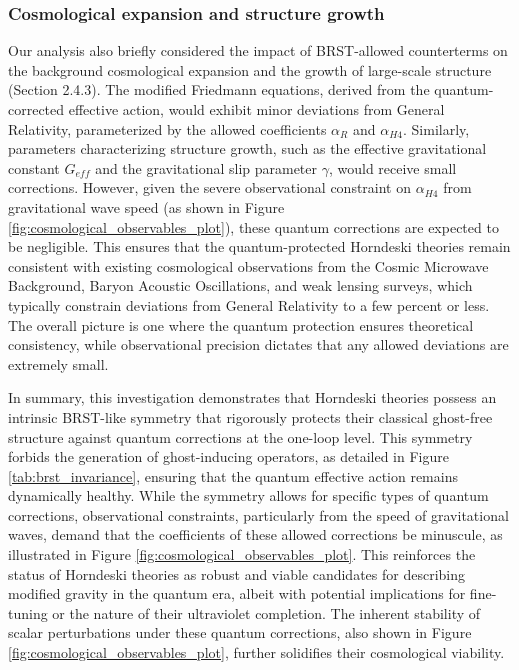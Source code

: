 \documentclass[twocolumn]{aastex631}
\begin{document}
\subsubsection{Cosmological expansion and structure growth}
Our analysis also briefly considered the impact of BRST-allowed counterterms on the background cosmological expansion and the growth of large-scale structure (Section 2.4.3). The modified Friedmann equations, derived from the quantum-corrected effective action, would exhibit minor deviations from General Relativity, parameterized by the allowed coefficients $\alpha_R$ and $\alpha_{H4}$. Similarly, parameters characterizing structure growth, such as the effective gravitational constant $G_{eff}$ and the gravitational slip parameter $\gamma$, would receive small corrections. However, given the severe observational constraint on $\alpha_{H4}$ from gravitational wave speed (as shown in Figure \ref{fig:cosmological_observables_plot}), these quantum corrections are expected to be negligible. This ensures that the quantum-protected Horndeski theories remain consistent with existing cosmological observations from the Cosmic Microwave Background, Baryon Acoustic Oscillations, and weak lensing surveys, which typically constrain deviations from General Relativity to a few percent or less. The overall picture is one where the quantum protection ensures theoretical consistency, while observational precision dictates that any allowed deviations are extremely small.

In summary, this investigation demonstrates that Horndeski theories possess an intrinsic BRST-like symmetry that rigorously protects their classical ghost-free structure against quantum corrections at the one-loop level. This symmetry forbids the generation of ghost-inducing operators, as detailed in Figure \ref{tab:brst_invariance}, ensuring that the quantum effective action remains dynamically healthy. While the symmetry allows for specific types of quantum corrections, observational constraints, particularly from the speed of gravitational waves, demand that the coefficients of these allowed corrections be minuscule, as illustrated in Figure \ref{fig:cosmological_observables_plot}. This reinforces the status of Horndeski theories as robust and viable candidates for describing modified gravity in the quantum era, albeit with potential implications for fine-tuning or the nature of their ultraviolet completion. The inherent stability of scalar perturbations under these quantum corrections, also shown in Figure \ref{fig:cosmological_observables_plot}, further solidifies their cosmological viability.
\end{document}
